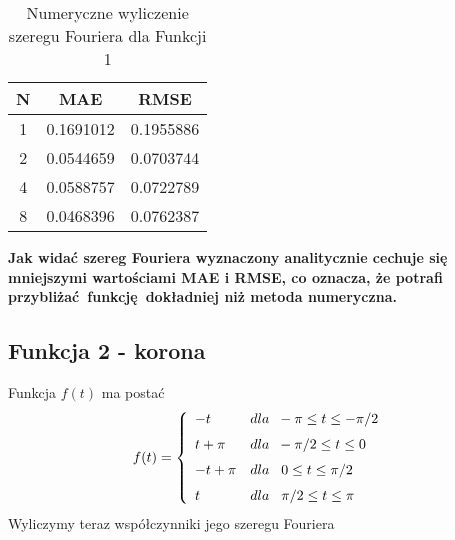 \documentclass[leqno,a4paper]{article}
\begin{document}
\begin{table}
\centering
\begin{tabular}{||c c c||} 
 \hline
 N & MAE & RMSE \\ 
 \hline\hline
 1 & 0.1691012 & 0.1955886 \\ 
 2 & 0.0544659 & 0.0703744 \\
 4 & 0.0588757 & 0.0722789 \\
 8 & 0.0468396 & 0.0762387 \\
 \hline\hline
\end{tabular}
\caption{Numeryczne wyliczenie szeregu Fouriera dla Funkcji 1}
\end{table}

\textbf{Jak widać szereg Fouriera wyznaczony analitycznie cechuje się mniejszymi wartościami MAE i RMSE, co oznacza, że potrafi przybliżać funkcję dokładniej niż metoda numeryczna.}


{}
\subsection*{Funkcja 2 - korona}

Funkcja $f(t)$ ma postać
\[  f(t)= \left\{
\begin{array}{ll}
      -t &dla\hspace{0.2cm}-\pi \leq t\leq -\pi/2 \\[1.5ex]
      t+\pi &dla\hspace{0.2cm}-\pi/2 \leq t\leq 0 \\[1.5ex]
      -t+\pi &dla\hspace{0.3cm} 0\leq t\leq \pi/2 \\[1.5ex]
      t &dla\hspace{0.3cm}\pi/2 \leq t\leq \pi
\end{array}  
\right. \]
Wyliczymy teraz współczynniki jego szeregu Fouriera 
\newline
\end{document}

